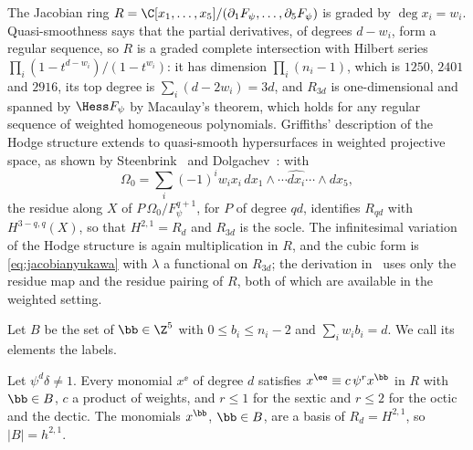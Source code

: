The Jacobian ring $R=\C[x_1,\dots,x_5]/(\partial_1F_\psi,\dots,
\partial_5F_\psi)$ is graded by $\deg x_i=w_i$. Quasi-smoothness says that
the partial derivatives, of degrees $d-w_i$, form a regular sequence, so
$R$ is a graded complete intersection with Hilbert series
$\prod_i(1-t^{d-w_i})/(1-t^{w_i})$: it has dimension $\prod_i(n_i-1)$, which
is $1250$, $2401$ and $2916$, its top degree is $\sum_i(d-2w_i)=3d$, and
$R_{3d}$ is one-dimensional and spanned by $\Hess F_\psi$ by Macaulay's
theorem, which holds for any regular sequence of weighted homogeneous
polynomials. Griffiths' description of the Hodge structure extends to
quasi-smooth hypersurfaces in weighted projective space, as shown by
Steenbrink~\cite{Ste77} and Dolgachev~\cite{Dol82}: with
\[
\Omega_0=\sum_i(-1)^iw_ix_i\,dx_1\wedge\cdots\widehat{dx_i}\cdots\wedge dx_5,
\]
the residue along $X$ of $P\,\Omega_0/F_\psi^{q+1}$, for $P$ of degree
$qd$, identifies $R_{qd}$ with $H^{3-q,q}(X)$, so that $H^{2,1}=R_d$ and
$R_{3d}$ is the socle. The
infinitesimal variation of the Hodge structure is again multiplication in
$R$, and the cubic form is \eqref{eq:jacobianyukawa} with $\lambda$ a
functional on $R_{3d}$; the derivation in~\cite{CG80} uses only the residue
map and the residue pairing of $R$, both of which are available in the
weighted setting.

Let $B$ be the set of $\bb\in\Z^5$ with $0\le b_i\le n_i-2$ and
$\sum_iw_ib_i=d$. We call its elements the labels.

\begin{lemma}\label{lem:wlabels}
Let $\psi^d\delta\ne1$. Every monomial $x^{\ee}$ of degree $d$ satisfies
$x^{\ee}\equiv c\,\psi^r x^{\bb}$ in $R$ with $\bb\in B$, $c$ a product of
weights, and $r\le1$ for the sextic and $r\le2$ for the octic and the
dectic. The monomials $x^{\bb}$, $\bb\in B$, are a basis of $R_d=H^{2,1}$,
so $|B|=h^{2,1}$.
\end{lemma}

